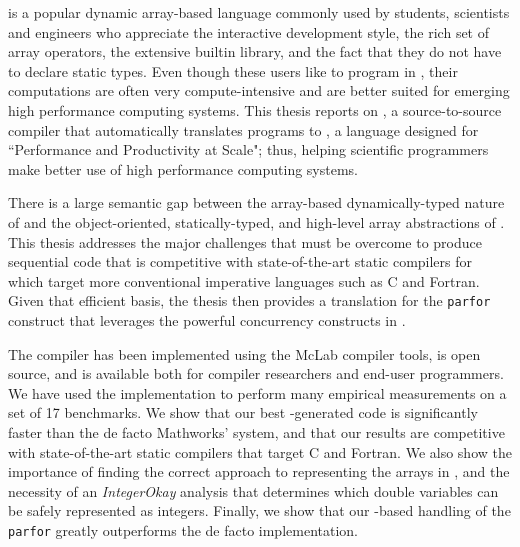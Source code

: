 \matlab is a popular dynamic array-based language commonly used by
students, scientists and engineers who appreciate the interactive
development style, the rich set of array operators, the extensive
builtin library, and the fact that they do not have to declare static
types. Even though these users like to program in \matlab, their
computations are often very compute-intensive and are better suited for
emerging high performance computing systems. This thesis reports on \mixten, a
source-to-source compiler that automatically translates \matlab programs
to \xten, a language designed for ``Performance and Productivity at Scale";
thus, helping scientific programmers make better use of high performance
computing systems.

There is a large semantic gap between the array-based dynamically-typed nature 
of \matlab and the object-oriented, statically-typed, and high-level array
abstractions of \xten.   This thesis addresses the major challenges that
must be overcome to produce sequential \xten code that is competitive with
state-of-the-art static compilers for \matlab which target more
conventional imperative languages such as C and Fortran.   Given that
efficient basis, the thesis then provides a translation for the \matlab
\texttt{parfor} construct that leverages the powerful concurrency
constructs in \xten. 

The \mixten compiler has been implemented using the McLab compiler
tools, is open source, and is available both for compiler researchers
and end-user \matlab programmers.   We have used the implementation to
perform many empirical measurements on a set of 17 \matlab benchmarks.
We show that our best \mixten-generated code is significantly faster
than the de facto Mathworks' \matlab system,  and that our results are
competitive with state-of-the-art static compilers that target C and
Fortran.   We also show the importance of finding the correct approach
to representing the arrays in \xten,  and the necessity of an
\emph{IntegerOkay}  analysis that determines which double variables
can be safely represented as integers.    Finally, we show that our
\xten-based handling of the \matlab \texttt{parfor} greatly outperforms
the de facto \matlab implementation. 
